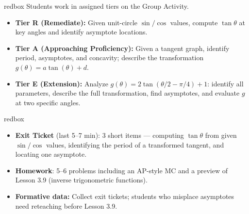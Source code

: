 \documentclass[10pt]{article}
\begin{document}
\begin{skillbox}{redbox}
  Students work in assigned tiers on the Group Activity.
  \begin{itemize}
    \item \textbf{Tier R (Remediate):} Given unit-circle $\sin/\cos$ values,
          compute $\tan\theta$ at key angles and identify asymptote locations.
    \item \textbf{Tier A (Approaching Proficiency):} Given a tangent graph,
          identify period, asymptotes, and concavity; describe the
          transformation $g(\theta)=a\tan(\theta)+d$.
    \item \textbf{Tier E (Extension):} Analyze
          $g(\theta)=2\tan(\theta/2-\pi/4)+1$: identify all parameters,
          describe the full transformation, find asymptotes, and evaluate $g$
          at two specific angles.
  \end{itemize}
\end{skillbox}

\begin{skillbox}{redbox}
  \begin{itemize}
    \item \textbf{Exit Ticket} (last 5--7 min): 3 short items --- computing
          $\tan\theta$ from given $\sin/\cos$ values, identifying the period
          of a transformed tangent, and locating one asymptote.
    \item \textbf{Homework}: 5--6 problems including an AP-style MC and a
          preview of Lesson 3.9 (inverse trigonometric functions).
    \item \textbf{Formative data:} Collect exit tickets; students who
          misplace asymptotes need reteaching before Lesson 3.9.
  \end{itemize}
\end{skillbox}
\end{document}
